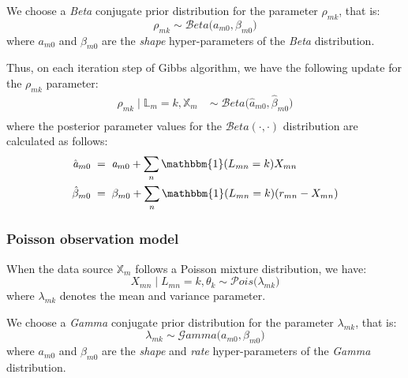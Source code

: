 We choose a \emph{Beta} conjugate prior distribution for the parameter $\rho_{mk}$, that is:
\begin{equation}
	\rho_{mk} \sim \mathcal{B}eta\big(\mathit{a}_{m0}, \beta_{m0}\big)
\end{equation}
where $\mathit{a}_{m0}$ and $\beta_{m0}$ are the \emph{shape} hyper-parameters of the \emph{Beta} distribution.

Thus, on each iteration step of Gibbs algorithm, we have the following update for the $\rho_{mk}$ parameter:
\begin{equation}
  \begin{aligned}
  	\rho_{mk} \mid \mathbb{L}_{m}=k, \mathbb{X}_{m} \;& \sim \;\mathcal{B}eta\big(\hat{\mathit{a}}_{m0}, \hat{\beta}_{m0}\big) \\
  \end{aligned}
\end{equation}
where the posterior parameter values for the $\mathcal{B}eta(\cdot,\cdot)$ distribution are calculated as follows:
\begin{equation}
  \begin{aligned}
  	\hat{\mathit{a}}_{m0} \; &= \; \mathit{a}_{m0} + \sum_{n}\mathbbm{1}(L_{mn}=k)X_{mn} \\
  	\hat{\beta}_{m0} \; &= \; \beta_{m0} +  \sum_{n}\mathbbm{1}(L_{mn}=k)(r_{mn} - X_{mn})
  \end{aligned}
\end{equation}

\subsubsection*{Poisson observation model}
When the data source $\mathbb{X}_{m}$ follows a Poisson mixture distribution, we have:
\begin{equation}
	X_{mn} \mid L_{mn} = k, \theta_{k} \sim \mathcal{P}ois\big(\lambda_{mk}\big)
\end{equation}
where $\lambda_{mk}$ denotes the mean and variance parameter.

We choose a \emph{Gamma} conjugate prior distribution for the parameter $\lambda_{mk}$, that is:
\begin{equation}
	\lambda_{mk} \sim \mathcal{G}amma\big(\mathit{a}_{m0}, \beta_{m0}\big)
\end{equation}
where $\mathit{a}_{m0}$ and $\beta_{m0}$ are the \emph{shape} and \emph{rate} hyper-parameters of the \emph{Gamma} distribution.

